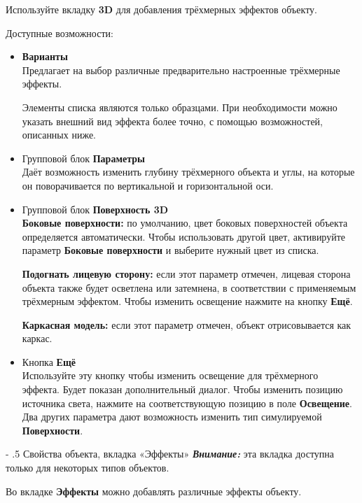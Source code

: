 ﻿\documentclass[a4paper,10pt]{article}
\makeatletter
\renewcommand\paragraph{%
   \@startsection{paragraph}{4}{0mm}%
      {-\baselineskip}%
      {.5\baselineskip}%
      {\normalfont\normalsize\bfseries}}
\makeatother
\begin{document}
Используйте вкладку \textbf{3D} для добавления трёхмерных эффектов объекту.

Доступные возможности:

\begin{itemize}
 \item \textbf{Варианты}\\
 Предлагает на выбор различные предварительно настроенные трёхмерные эффекты.
 
 Элементы списка являются только образцами. При необходимости можно указать внешний вид эффекта более точно, с помощью возможностей, описанных ниже.
  \item Групповой блок \textbf{Параметры}\\
  Даёт возможность изменить глубину трёхмерного объекта и углы, на которые он поворачивается по вертикальной и  горизонтальной оси.
    \item Групповой блок \textbf{Поверхность 3D}\\
    \textbf{Боковые поверхности:} по умолчанию, цвет боковых поверхностей объекта определяется автоматически. Чтобы использовать другой цвет, активируйте параметр \textbf{Боковые поверхности} и выберите нужный цвет из списка.
    
    \textbf{Подогнать лицевую сторону:} если этот параметр отмечен, лицевая сторона объекта также будет осветлена или затемнена, в соответствии с применяемым трёхмерным эффектом. Чтобы изменить освещение нажмите на кнопку \textbf{Ещё}.
    
    \textbf{Каркасная модель:} если этот параметр отмечен, объект отрисовывается как каркас.
    \item Кнопка \textbf{Ещё}\\
    Используйте эту кнопку чтобы изменить освещение для трёхмерного эффекта. Будет показан дополнительный диалог. Чтобы изменить позицию источника света, нажмите на соответствующую позицию в поле \textbf{Освещение}. Два других параметра дают возможность изменить тип симулируемой \textbf{Поверхности}.
 \end{itemize}

 \paragraph{Свойства объекта, вкладка «Эффекты»} \label{sec:свойстваобъектвклэффекты}
 \textit{\textbf{Внимание:}} эта вкладка доступна только для некоторых типов объектов.
 
 Во вкладке \textbf{Эффекты} можно добавлять различные эффекты объекту.
 
\end{document}
